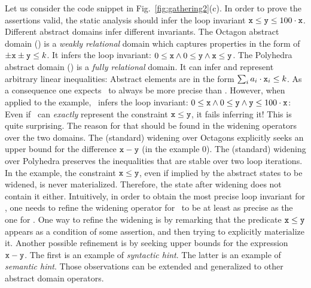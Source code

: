 \documentclass{llncs}
\begin{document}
 Let us consider the code snippet in Fig.~\ref{fig:gathering2}(c).
In order to prove the assertions valid, the static analysis should infer the loop invariant $\mathtt{x} \leq \mathtt{y} \leq 100 \cdot \mathtt{x}$.
Different abstract domains infer different invariants.
The Octagon abstract domain (\Octagons) is a \emph{weakly relational} domain which captures properties in the form of $\pm \mathtt{x} \pm \mathtt{y} \leq k$.
It infers the loop invariant: $0 \leq \mathtt{x} \wedge 0 \leq \mathtt{y} \wedge \mathtt{x} \leq \mathtt{y}$.
The Polyhedra abstract domain (\Polyhedra) is a \emph{fully relational} domain. 
It can infer and represent arbitrary linear inequalities: Abstract elements are in the form $\sum_i{a_i \cdot \mathtt{x}_i} \leq k$. 
As a consequence one expects \Polyhedra\ to always be more precise than \Octagons.
However, when applied to the example, \Polyhedra\ infers the loop
invariant:  $0 \leq \mathtt{x} \wedge 0 \leq \mathtt{y} \wedge \mathtt{y}
\leq 100 \cdot \mathtt{x}$: Even if \Polyhedra\  can \emph{exactly} represent the constraint $\mathtt{x} \leq \mathtt{y}$, it fails inferring it!
This is quite surprising. 
The reason for that should be found in the widening operators over the two domains.
The (standard) widening over Octagons explicitly seeks an upper bound for the difference $\mathtt{x} - \mathtt{y}$ (in the example $0$).
The (standard) widening over Polyhedra preserves the inequalities that are stable over two loop iterations.
In the example, the constraint $\mathtt{x} \leq \mathtt{y}$, even if implied by the abstract states to be widened, is never materialized. 
Therefore, the state after widening does not contain it either.
Intuitively, in order to obtain the most precise loop invariant for , one needs to refine the widening operator for \Polyhedra\ to be at least as precise as the one for \Octagons.
One way to refine the widening is by remarking that the predicate $\mathtt{x} \leq \mathtt{y}$ appears as a condition of some assertion, and then trying to explicitly materialize it.
Another possible refinement is by seeking upper bounds for the expression  $\mathtt{x} - \mathtt{y}$.
The first is an example of \emph{syntactic hint}.
The latter is an example of \emph{semantic hint}.
Those observations can be extended and generalized to other abstract
domain operators.
\end{document}
